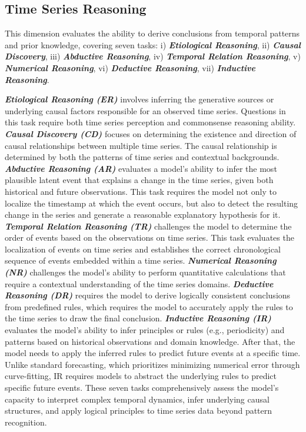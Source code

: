 \documentclass{article}
\theoremstyle{plain}
\theoremstyle{definition}
\theoremstyle{remark}
\theoremstyle{plain}
\begin{document}
\subsection{Time Series Reasoning}
This dimension evaluates the ability to derive conclusions from temporal patterns and prior knowledge, covering seven tasks:
i) \textbf{\textit{Etiological Reasoning}}, 
ii) \textbf{\textit{Causal Discovery}}, 
iii) \textbf{\textit{Abductive Reasoning}}, 
iv) \textbf{\textit{Temporal Relation Reasoning}}, 
v) \textbf{\textit{Numerical Reasoning}}, 
vi) \textbf{\textit{Deductive Reasoning}}, 
vii) \textbf{\textit{Inductive Reasoning}}.

\textbf{\textit{Etiological Reasoning (ER)}} involves inferring the generative sources or underlying causal factors responsible for an observed time series. Questions in this task require both time series perception and commonsense reasoning ability. 
\textbf{\textit{Causal Discovery (CD)}} focuses on determining the existence and direction of causal relationships between multiple time series. The causal relationship is determined by both the patterns of time series and contextual backgrounds. 
\textbf{\textit{Abductive Reasoning (AR)}} evaluates a model’s ability to infer the most plausible latent event that explains a change in the time series, given both historical and future observations. This task requires the model not only to localize the timestamp at which the event occurs, but also to detect the resulting change in the series and generate a reasonable explanatory hypothesis for it.
\textbf{\textit{Temporal Relation Reasoning (TR)}} challenges the model to determine the order of events based on the observations on time series. This task evaluates the localization of events on time series and establishes the correct chronological sequence of events embedded within a time series. \textbf{\textit{Numerical Reasoning (NR)}} challenges the model's ability to perform quantitative calculations that require a contextual understanding of the time series domains. \textbf{\textit{Deductive Reasoning (DR)}} requires the model to derive logically consistent conclusions from predefined rules, which requires the model to accurately apply the rules to the time series to draw the final conclusion. 
\textbf{\textit{Inductive Reasoning (IR)}} evaluates the model's ability to infer principles or rules (e.g., periodicity) and patterns based on historical observations and domain knowledge. After that, the model needs to apply the inferred rules to predict future events at a specific time. Unlike standard forecasting, which prioritizes minimizing numerical error through curve-fitting, IR requires models to abstract the underlying rules to predict specific future events. These seven tasks comprehensively assess the model's capacity to interpret complex temporal dynamics, infer underlying causal structures, and apply logical principles to time series data beyond pattern recognition. 
\end{document}
